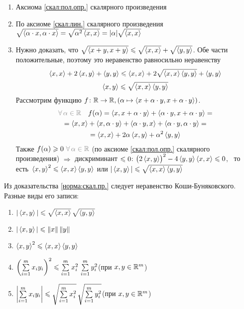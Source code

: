 \begin{prf}
	\begin{enumerate}
		\item Аксиома \ref{скал:пол.опр.} скалярного произведения
		
		\item По аксиоме \ref{скал:лин.} скалярного произведения $\sqrt{\left<\alpha \cdot x, \alpha \cdot x\right>} = \sqrt{\alpha^2\left<x, x\right>} = |\alpha|\sqrt{\left<x, x\right>} $
		
		\item Нужно доказать, что 
		$\sqrt{\left<x + y, x + y\right>} \leqslant \sqrt{\left<x, x\right>} + \sqrt{\left<y, y\right>}$. Обе части положительные, поэтому это неравенство равносильно неравенству
		\[\left<x, x\right> + 2\left<x, y\right> + \left<y, y\right> \leqslant \left<x, x\right> + 2\sqrt{\left<x, x\right>\left<y, y\right>} + \left<y, y\right>\]
		\[\left<x, y\right> \leqslant \sqrt{\left<x, x\right>\left<y, y\right>}\]
		Рассмотрим функцию $f \colon \mathbb R \to \mathbb R, (\alpha \mapsto \left<x + \alpha \cdot y, x + \alpha \cdot y\right>)$. 
		\begin{multline*}
			\uns{\A \alpha \in \rr} \quad f(\alpha) = \scal{x, x + \alpha \cdot y} + \scal{\alpha \cdot y, x + \alpha \cdot y} = \\ 
			= \scal{x, x} + \scal{x, \alpha \cdot y} + \scal{\alpha \cdot y, x} + \scal{\alpha \cdot y, \alpha \cdot y} =\\ 
			= \scal{x, x} + 2 \alpha \scal{x, y} + \alpha^2 \scal{y, y} 
		\end{multline*}
		Также $f(\alpha) \biger 0\ \uns{\A \alpha \in \rr}$ (по аксиоме \ref{скал:пол.опр.} скалярного произведения) $\Rightarrow$ дискриминант $\leqslant 0$:
		$\bigl(2\left<x, y\right>\bigr)^2 - 4\left<y, y\right>\left<x, x\right> \leqslant 0$, \, то есть\, $\left<x, y\right>^2 \leqslant \left<x, x\right>\left<y, y\right>$ или $|\left<x, y\right>|\leqslant \sqrt{\left<x, x\right>\left<y, y\right>}$
	\end{enumerate} %
\end{prf}
\pagebreak
\begin{slv}
	Из доказательства \ref{норма:скал.пр.} следует неравенство Коши-Буняковского. Разные виды его записи:
	\begin{multicols}{2}
	\begin{enumerate}
		\item $|\left<x, y\right>| \leqslant \sqrt{\left<x, x\right>}\,\sqrt{\left<y, y\right>}$
		
		\item $|\left<x, y\right>|\leqslant \|x\|\, \|y\|$ 
		
		\item $\left<x, y\right>^2 \leqslant \left<x, x\right>\left<y, y\right>$

		\item $\left(\sum\limits_{i=1}^m x_iy_i\right)^2 \leqslant \sum\limits_{i = 1}^m x_i^2 \, \sum\limits_{i = 1}^m y_i^2$\quad(при $x, y \in \mathbb R^m$)
		
		\item  $\left|\sum\limits_{i=1}^m x_iy_i\right| \leqslant \sqrt{\sum\limits_{i = 1}^m x_i^2} \, \sqrt{\sum\limits_{i = 1}^m y_i^2}$\quad(при $x, y \in \mathbb R^m$)
	\end{enumerate}
	\end{multicols}
	
\end{slv}

